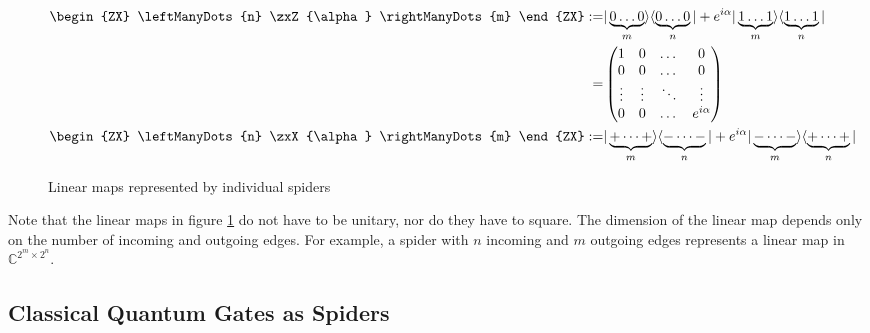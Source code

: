 \begin{figure}[h]
    \begin{align*}
        \begin{ZX}
            \leftManyDots{n}  \zxZ{\alpha} \rightManyDots{m}
        \end{ZX}
        :=                                               & |\underbrace{0\dots 0}_{m}\rangle \langle \underbrace{0\dots0}_{n}| + e^{i\alpha}|\underbrace{1\dots1}_{m}\rangle \langle \underbrace{1\dots1}_{n}|
        \\
        =                                                & \begin{pmatrix}
                                                               1      & 0      & \dots  & 0           \\
                                                               0      & 0      & \dots  & 0           \\
                                                               \vdots & \vdots & \ddots & \vdots      \\
                                                               0      & 0      & \dots  & e^{i\alpha} \\
                                                           \end{pmatrix}
        \\
        \begin{ZX}
            \leftManyDots{n}  \zxX{\alpha} \rightManyDots{m}
        \end{ZX} := & |\underbrace{+ \dots +}_{m}\rangle \langle \underbrace{- \dots -}_{n}| + e^{i\alpha}|\underbrace{- \dots -}_{m}\rangle \langle \underbrace{+ \dots +}_{n}|
        \\
    \end{align*}
    \caption{Linear maps represented by individual spiders}
    \label{fig:individual-spiders-linear-maps}
\end{figure}

Note that the linear maps in figure \ref{fig:individual-spiders-linear-maps} do not have to be unitary, nor do they have to square. The dimension of the linear map depends only on the number of incoming and outgoing edges. For example, a spider with $n$ incoming and $m$ outgoing edges represents a linear map in $\mathbb{C}^{2^m \times 2^n}$.


\subsection{Classical Quantum Gates as Spiders}

